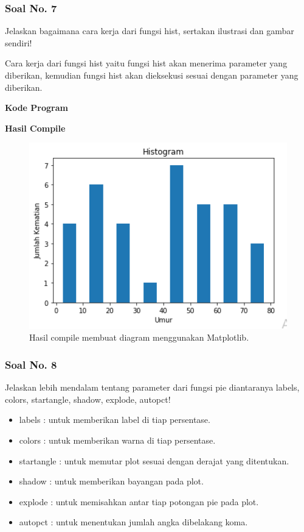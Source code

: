 \subsubsection{Soal No. 7}
\hfill \break
Jelaskan bagaimana cara kerja dari fungsi hist, sertakan ilustrasi dan gambar sendiri!

\hfill \break
Cara kerja dari fungsi hist yaitu fungsi hist akan menerima parameter yang diberikan, kemudian fungsi hist akan dieksekusi sesuai dengan parameter yang diberikan.

\hfill \break
\textbf{Kode Program}



\hfill \break
\textbf{Hasil Compile}

\begin{figure}[H]
	\includegraphics[width=12cm]{figures/6/1174086/histogram.png}
	\centering
	\caption{Hasil compile membuat diagram menggunakan Matplotlib.}
\end{figure}

\subsubsection{Soal No. 8}
\hfill \break
 Jelaskan lebih mendalam tentang parameter dari fungsi pie diantaranya labels, colors, startangle, shadow, explode, autopct!
 
 \begin{itemize}
 	\item labels : untuk memberikan label di tiap persentase.
 	\item colors : untuk memberikan warna di tiap persentase.
 	\item startangle : untuk memutar plot sesuai dengan derajat yang ditentukan.
 	\item shadow : untuk memberikan bayangan pada plot.
 	\item explode : untuk memisahkan antar tiap potongan pie pada plot.
 	\item autopct : untuk menentukan jumlah angka dibelakang koma.
 \end{itemize}



